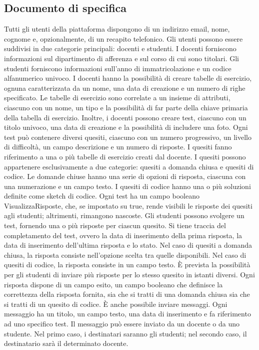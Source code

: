 \documentclass{article}
\begin{document}
\subsection{Documento di specifica}
\large
Tutti gli utenti della piattaforma dispongono di un indirizzo email, nome, cognome e, opzionalmente, di un recapito telefonico. Gli utenti possono essere suddivisi in due categorie principali: docenti e studenti. I docenti forniscono informazioni sul dipartimento di afferenza e sul corso di cui sono titolari.
Gli studenti forniscono informazioni sull'anno di immatricolazione e un codice alfanumerico univoco.
I docenti hanno la possibilità di creare tabelle di esercizio, ognuna caratterizzata da un nome, una data di creazione e un numero di righe specificato. Le tabelle di esercizio sono correlate a un insieme di attributi, ciascuno con un nome, un tipo e la possibilità di far parte della chiave primaria della tabella di esercizio.
Inoltre, i docenti possono creare test, ciascuno con un titolo univoco, una data di creazione e la possibilità di includere una foto. Ogni test può contenere diversi quesiti, ciascuno con un numero progressivo, un livello di difficoltà, un campo descrizione e un numero di risposte. I quesiti fanno riferimento a una o più tabelle di esercizio creati dal docente.
I quesiti possono appartenere esclusivamente a due categorie: quesiti a domanda chiusa e quesiti di codice. Le domande chiuse hanno una serie di opzioni di risposta, ciascuna con una numerazione e un campo testo. I quesiti di codice hanno una o più soluzioni definite come sketch di codice.
Ogni test ha un campo booleano VisualizzaRisposte, che, se impostato su true, rende visibili le risposte dei quesiti agli studenti; altrimenti, rimangono nascoste. Gli studenti possono svolgere un test, fornendo una o più risposte per ciascun quesito. Si tiene traccia del completamento del test, ovvero la data di inserimento della prima risposta, la data di inserimento dell'ultima risposta e lo stato.
Nel caso di quesiti a domanda chiusa, la risposta consiste nell'opzione scelta tra quelle disponibili. Nel caso di quesiti di codice, la risposta consiste in un campo testo. È prevista la possibilità per gli studenti di inviare più risposte per lo stesso quesito in istanti diversi. Ogni risposta dispone di un campo esito, un campo booleano che definisce la correttezza della risposta fornita, sia che si tratti di una domanda chiusa sia che si tratti di un quesito di codice.
È anche possibile inviare messaggi. Ogni messaggio ha un titolo, un campo testo, una data di inserimento e fa riferimento ad uno specifico test. Il messaggio può essere inviato da un docente o da uno studente. Nel primo caso, i destinatari saranno gli studenti; nel secondo caso, il destinatario sarà il determinato docente.
\end{document}
